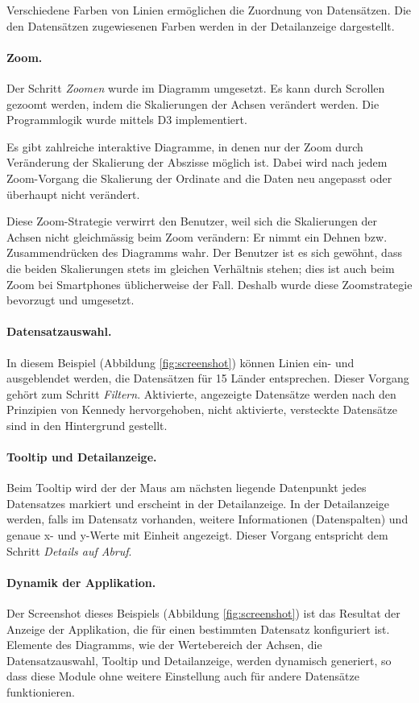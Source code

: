 Verschiedene Farben von Linien ermöglichen die Zuordnung von Datensätzen. Die den Datensätzen zugewiesenen Farben werden in der Detailanzeige dargestellt.

\paragraph{Zoom.} Der Schritt \textit{Zoomen} wurde im Diagramm umgesetzt. Es kann durch Scrollen gezoomt werden, indem die Skalierungen der Achsen verändert werden. Die Programmlogik wurde mittels D3 implementiert. 

Es gibt zahlreiche interaktive Diagramme, in denen nur der Zoom durch Veränderung der Skalierung der Abszisse möglich ist. Dabei wird nach jedem Zoom-Vorgang die Skalierung der Ordinate and die Daten neu angepasst oder überhaupt nicht verändert.

Diese Zoom-Strategie verwirrt den Benutzer, weil sich die Skalierungen der Achsen nicht gleichmässig beim Zoom verändern: Er nimmt ein Dehnen bzw. Zusammendrücken des Diagramms wahr. Der Benutzer ist es sich gewöhnt, dass die beiden Skalierungen stets im gleichen Verhältnis stehen; dies ist auch beim Zoom bei Smartphones üblicherweise der Fall. Deshalb wurde diese Zoomstrategie bevorzugt und umgesetzt.

\paragraph{Datensatzauswahl.} In diesem Beispiel (Abbildung \ref{fig:screenshot}) können Linien ein- und ausgeblendet werden, die Datensätzen für 15 Länder entsprechen. Dieser Vorgang gehört zum Schritt \textit{Filtern}. Aktivierte, angezeigte Datensätze werden nach den Prinzipien von Kennedy \cite{pop} hervorgehoben, nicht aktivierte, versteckte Datensätze sind in den Hintergrund gestellt.

\paragraph{Tooltip und Detailanzeige.} Beim Tooltip wird der der Maus am nächsten liegende Datenpunkt jedes Datensatzes markiert und erscheint in der Detailanzeige. In der Detailanzeige werden, falls im Datensatz vorhanden, weitere Informationen (Datenspalten) und genaue x- und y-Werte mit Einheit angezeigt. Dieser Vorgang entspricht dem Schritt \textit{Details auf Abruf}.

\paragraph{Dynamik der Applikation.} Der Screenshot dieses Beispiels (Abbildung \ref{fig:screenshot}) ist das Resultat der Anzeige der Applikation, die für einen bestimmten Datensatz konfiguriert ist. Elemente des Diagramms, wie der Wertebereich der Achsen, die Datensatzauswahl, Tooltip und Detailanzeige, werden dynamisch generiert, so dass diese Module ohne weitere Einstellung auch für andere Datensätze funktionieren.

